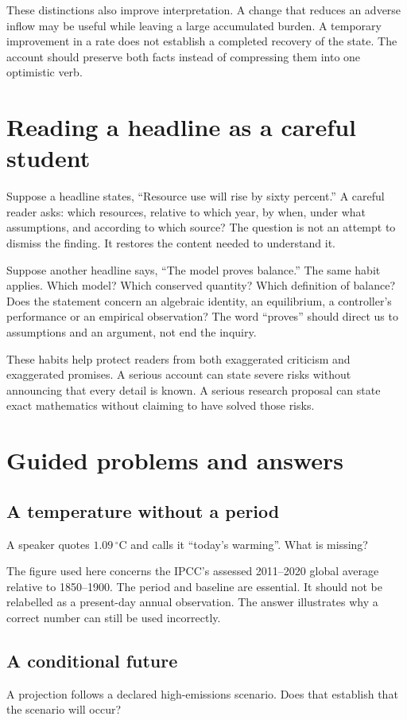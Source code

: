These distinctions also improve interpretation. A change that reduces an adverse inflow may be useful while leaving a large accumulated burden. A temporary improvement in a rate does not establish a completed recovery of the state. The account should preserve both facts instead of compressing them into one optimistic verb.

\section{Reading a headline as a careful student}
Suppose a headline states, ``Resource use will rise by sixty percent.'' A careful reader asks: which resources, relative to which year, by when, under what assumptions, and according to which source? The question is not an attempt to dismiss the finding. It restores the content needed to understand it.

Suppose another headline says, ``The model proves balance.'' The same habit applies. Which model? Which conserved quantity? Which definition of balance? Does the statement concern an algebraic identity, an equilibrium, a controller's performance or an empirical observation? The word ``proves'' should direct us to assumptions and an argument, not end the inquiry.

These habits help protect readers from both exaggerated criticism and exaggerated promises. A serious account can state severe risks without announcing that every detail is known. A serious research proposal can state exact mathematics without claiming to have solved those risks.

\section{Guided problems and answers}
\subsection{A temperature without a period}
A speaker quotes $1.09\,^{\circ}\mathrm{C}$ and calls it ``today's warming''. What is missing?

The figure used here concerns the IPCC's assessed 2011--2020 global average relative to 1850--1900. The period and baseline are essential. It should not be relabelled as a present-day annual observation. The answer illustrates why a correct number can still be used incorrectly.

\subsection{A conditional future}
A projection follows a declared high-emissions scenario. Does that establish that the scenario will occur?

